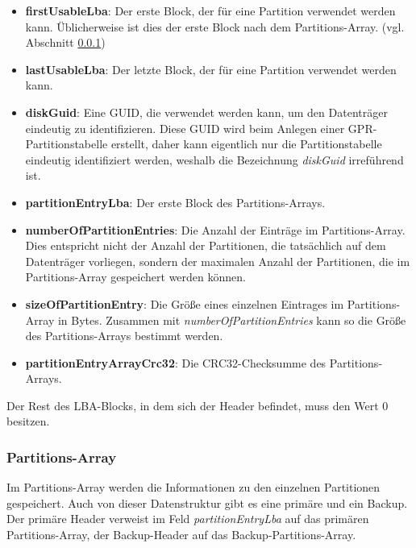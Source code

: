 \begin{itemize}
    \item \textbf{firstUsableLba}:
    Der erste Block, der für eine Partition verwendet werden kann.
    Üblicherweise ist dies der erste Block nach dem Partitions-Array. (vgl. Abschnitt \ref{sec:gpt:structure:entry-array})

    \item \textbf{lastUsableLba}:
    Der letzte Block, der für eine Partition verwendet werden kann.

    \item \textbf{diskGuid}:
    Eine GUID, die verwendet werden kann, um den Datenträger eindeutig zu identifizieren.\cite{uefi-spec}
    Diese GUID wird beim Anlegen einer GPR-Partitionstabelle erstellt, daher kann eigentlich nur die Partitionstabelle eindeutig identifiziert werden, weshalb die Bezeichnung \textit{diskGuid} irreführend ist.

    \item \textbf{partitionEntryLba}:
    Der erste Block des Partitions-Arrays. 

    \item \textbf{numberOfPartitionEntries}:
    Die Anzahl der Einträge im Partitions-Array.
    Dies entspricht nicht der Anzahl der Partitionen, die tatsächlich auf dem Datenträger vorliegen, sondern der maximalen Anzahl der Partitionen, die im Partitions-Array gespeichert werden können.

    \item \textbf{sizeOfPartitionEntry}:
    Die Größe eines einzelnen Eintrages im Partitions-Array in Bytes.
    Zusammen mit \textit{numberOfPartitionEntries} kann so die Größe des Partitions-Arrays bestimmt werden.

    \item \textbf{partitionEntryArrayCrc32}:
    Die CRC32-Checksumme des Partitions-Arrays.
    
\end{itemize}

Der Rest des LBA-Blocks, in dem sich der Header befindet, muss den Wert 0 besitzen.

\subsubsection{Partitions-Array}
\label{sec:gpt:structure:entry-array}
Im Partitions-Array werden die Informationen zu den einzelnen Partitionen gespeichert.
Auch von dieser Datenstruktur gibt es eine primäre und ein Backup.
Der primäre Header verweist im Feld \textit{partitionEntryLba} auf das primären Partitions-Array, der Backup-Header auf das Backup-Partitions-Array.


